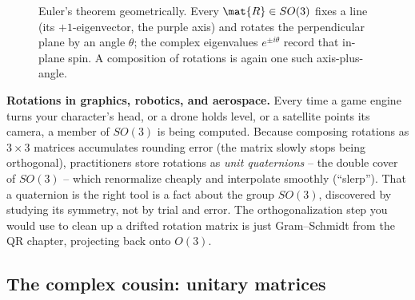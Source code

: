 \begin{figure}[H]
\centering
{}
\caption{Euler's theorem geometrically. Every $\mat{R}\in SO(3)$ fixes a line (its
$+1$-eigenvector, the purple axis) and rotates the perpendicular plane by an angle
$\theta$; the complex eigenvalues $e^{\pm i\theta}$ record that in-plane spin. A
composition of rotations is again one such axis-plus-angle.}
\label{ch37:fig-euleraxis}
\end{figure}

\begin{applicationbox}
\textbf{Rotations in graphics, robotics, and aerospace.} Every time a game engine
turns your character's head, or a drone holds level, or a satellite points its
camera, a member of $SO(3)$ is being computed. Because composing rotations as
$3\times 3$ matrices accumulates rounding error (the matrix slowly stops being
orthogonal), practitioners store rotations as \emph{unit quaternions} -- the
double cover of $SO(3)$ -- which renormalize cheaply and interpolate smoothly
(``slerp''). That a quaternion is the right tool is a fact about the group
$SO(3)$, discovered by studying its symmetry, not by trial and error. The
orthogonalization step you would use to clean up a drifted rotation matrix is just
Gram--Schmidt from the QR chapter, projecting back onto $O(3)$.
\end{applicationbox}

\subsection{The complex cousin: unitary matrices}
\label{ch37:unitary}


